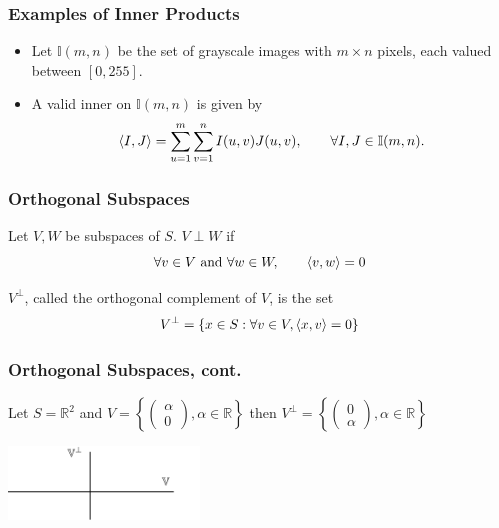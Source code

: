 \documentclass{beamer}
\begin{document}
\begin{frame}\frametitle{Examples of Inner Products}	
\begin{itemize}
\item	Let $\mathbb{I}(m,n)$ be the set of grayscale images with $m\times n$ pixels, each valued between $[0, 255]$.  
\item A valid inner on $\mathbb{I}(m,n)$ is given by
	\[
	\left<I, J\right> = \sum_{u=1}^m \sum_{v=1}^n I(u,v)J(u,v), \qquad \forall I, J \in \mathbb{I}(m,n).
	\]
\end{itemize}

\end{frame}


\begin{frame}\frametitle{Orthogonal Subspaces}
	
\begin{definition} Let $V,W$ be subspaces of $S$.  $V \perp W$ if 
\[\forall v \in V \text{ and  } \forall w \in W, \qquad \left< v,w \right> = 0\]
\end{definition}
\begin{definition}
$V^{\perp}$, called the orthogonal complement of $V$, is  the set
\[ V^{\perp} = \{ x \in S : \forall v \in V, \left< x,v\right> = 0 \} \]	
\end{definition}

\end{frame}

\begin{frame}\frametitle{Orthogonal Subspaces, cont.}
\begin{example}
Let $S=\mathbb{R}^2$ and $V = \left\{ \left( \begin{array}{c} \alpha\\0\end{array}\right), \alpha \in \mathbb{R} \right\}$ 
then $V^{\perp} = \left\{ \left( \begin{array}{c} 0\\\alpha\end{array}\right), \alpha \in \mathbb{R} \right\}$

\begin{center}
 \includegraphics[width=2in]{figures/chap2_orthogonal_subspaces}		
\end{center}

\end{example}

\end{frame}
\end{document}
